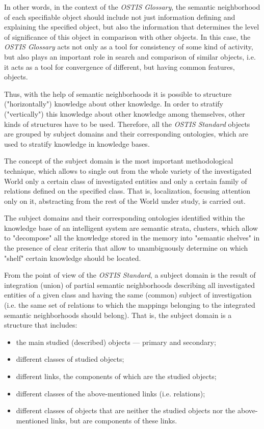 \documentclass{scndocument}
\begin{document}
\begin{multicols}{2}
    In other words, in the context of the \textit{OSTIS Glossary}, the semantic neighborhood of each specifiable object should include not just information defining and explaining the specified object, but also the information that determines the level of significance of this object in comparison with other objects. In this case, the \textit{OSTIS Glossary} acts not only as a tool for consistency of some kind of activity, but also plays an important role in search and comparison of similar objects, i.e. it acts as a tool for convergence of different, but having common features, objects.
    
    Thus, with the help of semantic neighborhoods it is possible to structure ("horizontally") knowledge about other knowledge. In order to stratify ("vertically") this knowledge about other knowledge among themselves, other kinds of structures have to be used. Therefore, all the \textit{OSTIS Standard} objects are grouped by subject domains and their corresponding ontologies, which are used to stratify knowledge in knowledge bases.

    The concept of the subject domain is the most important methodological technique, which allows to single out from the whole variety of the investigated World only a certain class of investigated entities and only a certain family of relations defined on the specified class. That is, localization, focusing attention only on it, abstracting from the rest of the World under study, is carried out.

    The subject domains and their corresponding ontologies identified within the knowledge base of an intelligent system are semantic strata, clusters, which allow to "decompose" all the knowledge stored in the memory into "semantic shelves" in the presence of clear criteria that allow to unambiguously determine on which "shelf" certain knowledge should be located.

    From the point of view of the \textit{OSTIS Standard}, a subject domain is the result of integration (union) of partial semantic neighborhoods describing all investigated entities of a given class and having the same (common) subject of investigation (i.e. the same set of relations to which the mappings belonging to the integrated semantic neighborhoods should belong). That is, the subject domain is a structure that includes:
    \begin{itemize}
        \item the main studied (described) objects — primary and secondary;
        \item different classes of studied objects;
        \item different links, the components of which are the studied objects;
        \item different classes of the above-mentioned links (i.e. relations);
        \item different classes of objects that are neither the studied objects nor the above-mentioned links, but are components of these links.
    \end{itemize}


\end{multicols}
\end{document}
